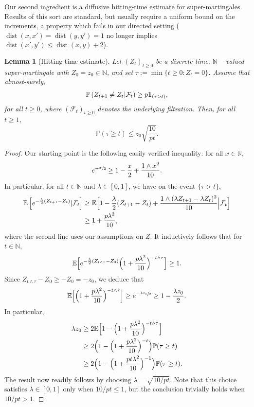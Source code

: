 \documentclass[10pt]{amsart}
\newtheorem{lemma}{Lemma}
\theoremstyle{definition}
\newcommand{\dN}{\mathbb {N}}
\newcommand{\dR}{\mathbb {R}}
\newcommand{\EE}{{\mathbb{E}}}
\newcommand{\PP}{{\mathbb{P}}}
\newcommand{\cF}{\mathcal {F}}
\DeclareMathOperator{\dist}{dist}
\begin{document}
Our second ingredient is a diffusive hitting-time estimate for super-martingales. Results of this sort are standard, but usually require a uniform bound on the increments, a property which fails in our directed setting ($\dist(x,x')=\dist(y,y')=1$ no longer implies $\dist(x',y')\le \dist(x,y)+2$).
\begin{lemma}[Hitting-time estimate]\label{lm:super}Let $(Z_t)_{t\ge 0}$ be a discrete-time, $\dN-$valued super-martingale with $Z_0=z_0\in\dN$, and set $\tau:=\min\{t\ge 0\colon Z_t= 0\}$. Assume that almost-surely,
\begin{equation*}
\PP\left(Z_{t+1}\ne Z_t | \cF_t\right) \ge p {\bf 1}_{(\tau>t)},
\end{equation*}
for all $t\ge 0$, where $(\cF_t)_{t\ge 0}$ denotes the underlying filtration. Then, for all $t\ge 1$,
\begin{equation*}
\PP(\tau\ge t) \le z_0\sqrt{\frac{10}{pt}}.
\end{equation*}
\end{lemma}
\begin{proof}Our starting point is the following easily verified inequality: for all $x\in\dR$,
\begin{equation*}
e^{-\sfrac{x}{2}} \ge 1-\frac{x}{2} + \frac{1 \wedge x^2}{10}.
\end{equation*}
In particular, for all $t\in\dN$ and $\lambda\in[0,1]$, we have on the event $\{\tau>t\}$,
\begin{align*}
\EE\left[e^{-\frac{\lambda}{2}(Z_{t+1}-Z_t)}|\cF_t\right] & \ge \EE\Bigl[1-\frac{\lambda}{2}(Z_{t+1}-Z_t)+ \frac{1\wedge (\lambda Z_{t+1}-\lambda Z_t)^2}{10}\Big|\cF_t\Bigr]\\
& \ge 1+\frac{p\lambda^2}{10},
\end{align*}
where the second line uses our assumptions on $Z$. It inductively follows that for $t\in\dN$,
\begin{equation*}
\EE \Bigl[e^{-\frac{\lambda}{2} (Z_{t\wedge\tau}-Z_0)} \Bigl(1+\frac{p\lambda^2}{10} \Bigr)^{-t\wedge \tau} \Bigr] \ge 1.
\end{equation*}
Since $Z_{t\wedge\tau}-Z_0\ge -Z_0=-z_0$, we deduce that
\begin{equation*}
\EE \Bigl[\Bigl(1+\frac{p\lambda^2}{10} \Bigr)^{-t\wedge \tau} \Bigr] \ge e^{-\sfrac{\lambda z_0}{2}} \ge 1-\frac{\lambda z_0}{2}.
\end{equation*}
In particular,
\begin{align*}
{\lambda z_0} & \ge 2\EE \Bigl[1-\Bigl(1+\frac{p\lambda^2}{10} \Bigr)^{-t\wedge \tau} \Bigr]\\
& \ge 2 \Bigl(1-\Bigl(1+\frac{p\lambda^2}{10} \Bigr)^{-t} \Bigr)\PP(\tau\ge t)\\
& \ge 2 \Bigl(1-\Bigl(1+\frac{p t\lambda^2}{10} \Bigr)^{-1} \Bigr)\PP(\tau\ge t).
\end{align*}
The result now readily follows by choosing $\lambda= \sqrt{10/pt}$. Note that this choice satisfies $\lambda\in[0,1]$ only when $10/pt\le 1$, but the conclusion trivially holds when $10/pt> 1$.
\end{proof}
\end{document}

